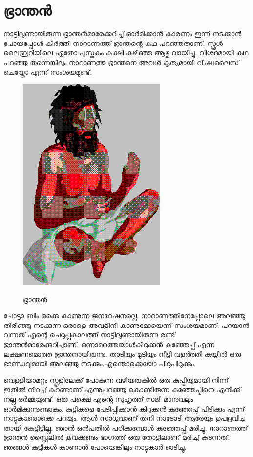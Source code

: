 \documentclass[10pt,a4paper]{report}
\begin{document}
\section{ ഭ്രാന്തൻ}
നാട്ടിലുണ്ടായിരുന്ന ഭ്രാന്തൻമാരേക്കറിച്ച് ഓർമിക്കാൻ കാരണം ഇന്ന് നടക്കാൻ പോയപ്പോൾ കീർത്തി നാറാണത്ത് ഭ്രാന്തന്റെ കഥ പറഞ്ഞതാണ്. സ്കൂൾ ലൈബ്രറിയിലെ ഏതോ പുസ്തകം കക്ഷി കഴിഞ്ഞ ആഴ്ച വായിച്ചു. വിശദമായി കഥ പറഞ്ഞു തന്നെങ്കിലും നാറാണത്തു ഭ്രാന്തനെ അവൾ കൃത്യമായി വിഷ്വലൈസ് ചെയ്തോ എന്ന് സംശയമുണ്ട്.
  \begin{figure}[H]
  \center
\includegraphics[scale=.3]{images/bhr} 
\label{nv3}
\caption{  ഭ്രാന്തൻ }
\end{figure}
 ചോട്ടാ ബിം ഒക്കെ കാണുന്ന ജനറേഷനല്ലെ. നാറാണത്തിനേപ്പോലെ അലഞ്ഞു തിരിഞ്ഞു നടക്കുന്ന ഒരാളെ അവളിനി കാണുമോയെന്ന് സംശയമാണ്. പറയാൻ വന്നത് എന്റെ ചെറുപ്പകാലത്ത് നാട്ടിലുണ്ടായിരുന്ന രണ്ട് ഭ്രാന്തൻമാരേക്കുറിച്ചാണ്. ഒന്നാമത്തെയാൾകിറുക്കൻ കുഞ്ഞേപ്പ് എന്ന ലക്ഷണമൊത്ത ഭ്രാന്തനായിരുന്നു. താടിയും മുടിയും നീട്ടി വളർത്തി കയ്യിൽ ഒരു ഭാണ്ഡവുമായി അലഞ്ഞു നടക്കും.എന്തൊക്കെയോ പിറുപിറുക്കും. 
 
 വെള്ളിയാമറ്റം സ്കൂളിലേക്ക് പോകുന്ന വഴിയരുകിൽ ഒരു കുപ്പിയുമായി നിന്ന് ഇതിൽ നിറച്ച് കറണ്ടാണ് എന്നുപറഞ്ഞു കൊണ്ടിരുന്ന കുഞ്ഞേപ്പിനെ എനിക്ക് നല്ല ഒർമ്മയുണ്ട്. ഒരു പക്ഷെ എന്റെ സുഹൃത്ത് സജി മാനുവലും ഓർമിക്കുന്നുണ്ടാകും. കുട്ടികളെ പേടിപ്പിക്കാൻ കിറുക്കൻ കുഞ്ഞേപ്പ് പിടിക്കും എന്ന് നാട്ടുകാരൊക്കെ പറയും. ആൾ സാധുവാണ് തനി നാടോടി ആരേയും ഉപദ്രവിച്ച തായി കേട്ടിട്ടില്ല. ഞാൻ ഒൻപതിൽ പഠിക്കുമ്പോൾ കുഞ്ഞേപ്പ് മരിച്ചു. നാറാണത്ത് ഭ്രാന്തൻ സ്റ്റൈലിൽ കൂവക്കണ്ടം ഭാഗത്ത് ഒരു തോട്ടിലാണ് മരിച്ച് കടന്നത്. ഞങ്ങൾ കുട്ടികൾ കാണാൻ പോയെങ്കിലും നാട്ടുകാർ ഓടിച്ചു. 
 
\end{document}
